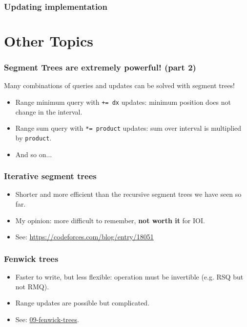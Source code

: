\documentclass[12pt]{beamer}
\begin{document}
\begin{frame}
    \frametitle{Updating implementation}
    
\end{frame}

\section{Other Topics}

\begin{frame}
    \frametitle{Segment Trees are extremely powerful! (part 2)}
    Many combinations of queries and updates can be solved with segment trees!
    \begin{itemize}
        \item Range minimum query with \lstinline{+= dx} updates: minimum position does not change in the interval.
        \item Range sum query with \lstinline{*= product} updates: sum over interval is multiplied by \lstinline{product}.
        \item And so on...
    \end{itemize}
\end{frame}

\begin{frame}
    \frametitle{Iterative segment trees}

    \begin{itemize}
        \item Shorter and more efficient than the recursive segment trees we have seen so far.
        \item My opinion: more difficult to remember, \textbf{not worth it} for IOI.
        \item See: \url{https://codeforces.com/blog/entry/18051}
    \end{itemize}
\end{frame}

\begin{frame}
    \frametitle{Fenwick trees}

    \begin{itemize}
        \item Faster to write, but less flexible: operation must be invertible (e.g. RSQ but not RMQ).
        \item Range updates are possible but complicated.
        \item See: \href{https://github.com/be-oi/beoi-training/tree/master/09-fenwick-tree}{09-fenwick-trees}.
    \end{itemize}
\end{frame}
\end{document}
